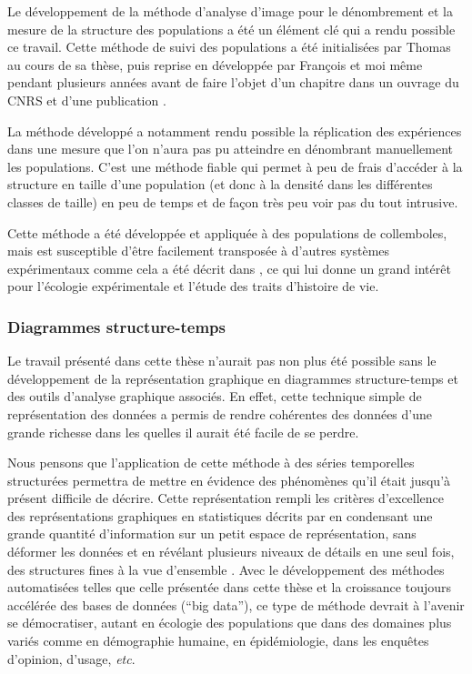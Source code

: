 Le développement de la méthode d'analyse d'image pour le dénombrement et la
mesure de la structure des populations a été un élément clé qui a rendu possible
ce travail. Cette méthode de suivi des populations a été initialisées par
Thomas \textcites{tully2004a} au cours de sa thèse, puis reprise en développée
par François \textcites{mallard2013b} et moi même pendant plusieurs années avant
de faire l'objet d'un chapitre dans un ouvrage du CNRS
\autocites{le-galliard2012a} et d'une publication \autocites{mallard2013a}.

La méthode développé a notamment rendu possible la réplication des expériences
dans une mesure que l'on n'aura pas pu atteindre en dénombrant manuellement les
populations. C'est une méthode fiable qui permet à peu de frais d'accéder à la
structure en taille d'une population (et donc à la densité dans les différentes
classes de taille) en peu de temps et de façon très peu voir pas du tout
intrusive. 

Cette méthode a été développée et appliquée à des populations de collemboles,
mais est susceptible d'être facilement transposée à d'autres systèmes
expérimentaux comme cela a été décrit dans \textcites{mallard2013a}, ce qui lui
donne un grand intérêt pour l'écologie expérimentale et l'étude des traits
d'histoire de vie. 

\subsubsection{Diagrammes structure-temps}

Le travail présenté dans cette thèse n'aurait pas non plus été possible sans le
développement de la représentation graphique en diagrammes structure-temps et
des outils d'analyse graphique associés. En effet, cette technique simple de
représentation des données a permis de rendre cohérentes des données d'une
grande richesse dans les quelles il aurait été facile de se perdre. 

Nous pensons que l'application de cette méthode à des séries temporelles
structurées permettra de mettre en évidence des phénomènes qu'il était jusqu'à
présent difficile de décrire. Cette représentation rempli les critères
d'excellence des représentations graphiques en statistiques décrits par
\textcites{tufte1990a} en condensant une grande quantité d'information sur un
petit espace de représentation, sans déformer les données et en révélant
plusieurs niveaux de détails en une seul fois, des structures fines à la vue
d'ensemble \autocites{tufte2001a}. Avec le développement des méthodes
automatisées telles que celle présentée dans cette thèse \autocites[voir aussi
][]{le-galliard2012a} et la croissance toujours accélérée des bases de données
(``big data''), ce type de méthode devrait à l'avenir se démocratiser, autant en
écologie des populations que dans des domaines plus variés comme en
démographie humaine, en épidémiologie, dans les enquêtes d'opinion, d'usage,
\textit{etc}.

